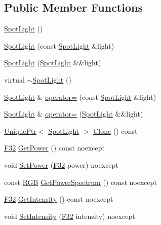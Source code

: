 \subsection*{Public Member Functions}
\begin{DoxyCompactItemize}
\item 
\hyperlink{classmage_1_1_spot_light_aa762e7cfb13da8949a9f4fb1a94c036d}{Spot\+Light} ()
\item 
\hyperlink{classmage_1_1_spot_light_a597abd916ed14372be208a68eb01b871}{Spot\+Light} (const \hyperlink{classmage_1_1_spot_light}{Spot\+Light} \&light)
\item 
\hyperlink{classmage_1_1_spot_light_a3a5574f34f5b80cbeef00709f8a9d094}{Spot\+Light} (\hyperlink{classmage_1_1_spot_light}{Spot\+Light} \&\&light)
\item 
virtual \hyperlink{classmage_1_1_spot_light_aeeaba91c6448102ac6a23587c5366808}{$\sim$\+Spot\+Light} ()
\item 
\hyperlink{classmage_1_1_spot_light}{Spot\+Light} \& \hyperlink{classmage_1_1_spot_light_a04a23d643186a58fb3a03d0a73a63e39}{operator=} (const \hyperlink{classmage_1_1_spot_light}{Spot\+Light} \&light)
\item 
\hyperlink{classmage_1_1_spot_light}{Spot\+Light} \& \hyperlink{classmage_1_1_spot_light_ab79e4bf1c488c1a753f434a4d84567e5}{operator=} (\hyperlink{classmage_1_1_spot_light}{Spot\+Light} \&\&light)
\item 
\hyperlink{namespacemage_a3316d7143a973e37adf1110f2e80ca31}{Unique\+Ptr}$<$ \hyperlink{classmage_1_1_spot_light}{Spot\+Light} $>$ \hyperlink{classmage_1_1_spot_light_a1092a1238be8cfd771a43e6976d16270}{Clone} () const
\item 
\hyperlink{namespacemage_aa97e833b45f06d60a0a9c4fc22ae02c0}{F32} \hyperlink{classmage_1_1_spot_light_afcfb600550f5ca9292e79e5bedb9fad7}{Get\+Power} () const noexcept
\item 
void \hyperlink{classmage_1_1_spot_light_aa2f5ad93e148d2d4fcf1512869c1ffa2}{Set\+Power} (\hyperlink{namespacemage_aa97e833b45f06d60a0a9c4fc22ae02c0}{F32} power) noexcept
\item 
const \hyperlink{structmage_1_1_r_g_b}{R\+GB} \hyperlink{classmage_1_1_spot_light_a2c9926f4332198ef4183f7958e9a5644}{Get\+Power\+Spectrum} () const noexcept
\item 
\hyperlink{namespacemage_aa97e833b45f06d60a0a9c4fc22ae02c0}{F32} \hyperlink{classmage_1_1_spot_light_a3df0792c637a6167c7c596ce125abbe0}{Get\+Intensity} () const noexcept
\item 
void \hyperlink{classmage_1_1_spot_light_a947290df545ea2a8ef2b486898b92bd3}{Set\+Intensity} (\hyperlink{namespacemage_aa97e833b45f06d60a0a9c4fc22ae02c0}{F32} intensity) noexcept

\end{DoxyCompactItemize}
